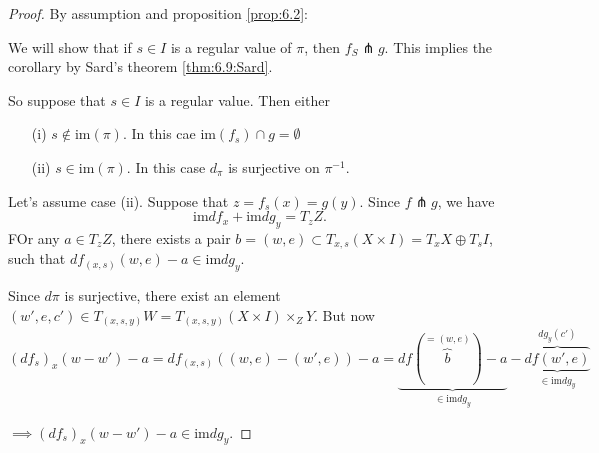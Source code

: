 \begin{proof}
    By assumption and proposition \ref{prop:6.2}: 
    \begin{center}
    \end{center}
    We will show that if \(s\in I\) is a regular value of \(\pi\), then \(f_S\pitchfork g\). This implies the corollary
    by Sard's theorem \ref{thm:6.9:Sard}.
    
    So suppose that \(s\in I \) is a regular value. Then either 
    \begin{enumerate}
        \item[(i)] \(s\notin\text{im}(\pi)\). In this cae \(\text{im}(f_s)\cap g=\emptyset\)
        \item[(ii)] \(s\in\text{im}(\pi)\). In this case \(d_\pi\)  is surjective on \(\pi^{-1}\). 
    \end{enumerate}
    Let's assume case (ii). Suppose that \(z=f_s(x)=g(y)\). Since  \(f\pitchfork g\), we have 
    \[\text{im}df_x+\text{im}dg_y=T_zZ.\]
    FOr any \(a\in T_zZ\), there exists a pair \(b=(w,e)\subset T_{x,s}(X\times I)=T_xX\oplus T_sI\),
    such that \(df_{(x,s)}(w,e)-a\in \text{im}dg_y.\) 

    Since \(d\pi\) is surjective, there exist an element \((w',e,c')\in T_{(x,s,y)}W=T_{(x,s,y)}(X\times I)\times_ZY\).
    But now \[(df_s)_x(w-w')-a=df_{(x,s)}((w,e)-(w',e))-a=\underbrace{df(\overbrace{b}^{=(w,e)})-a}_{\in \text{im}dg_y}-\underbrace{\overbrace{df(w',e)}^{dg_y(c')}}_{\in \text{im}dg_y}\]
    \begin{center}
    \end{center}
    \(\implies (df_s)_x(w-w')-a\in \text{im}dg_y\).

\end{proof}

